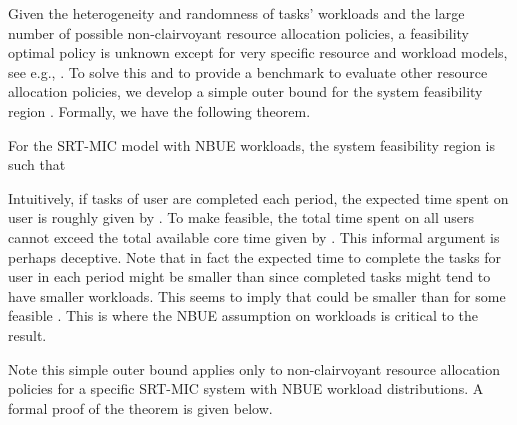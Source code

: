 \documentclass[prodmode,acmtompecs]{acmsmall}
\newcommand{\myComments}[1]{}
\newif\ifinfocom
\newif\iftompecs
\newif\ifdissertation
\newcommand{\infocomStart}{\ifinfocom \myComments{Infocom: }}
\newcommand{\tompecsStart}{\iftompecs \myComments{TOMPECS version: }}
\newcommand{\dissertationStart}{\ifdissertation  \myComments{Dissertation version: }}
\newcommand{\commentEnd}{\myComments{End}}
\begin{document}
\dissertationStart
Intuitively, a feasibility optimal non-clairvoyant design will orchestrate task scheduling across the  cores. For example, the system might choose to process tasks with the maximum conditional probability of success to maximize the expected number of task completions in some periods while guaranteeing fairness and thus the required  of users in other periods. 
\commentEnd\fi

Given the heterogeneity and randomness of tasks' workloads and the large number of possible non-clairvoyant resource allocation policies, a feasibility optimal policy is unknown except for very specific resource and workload models, see e.g., \cite{HoK12A}. To solve this and to provide a benchmark to evaluate other resource allocation policies, we develop a simple outer bound  for the system feasibility region . 
Formally, we have the following theorem. 
\begin{theorem}
\label{thm_optimal_benchmark}
For the SRT-MIC  model with NBUE workloads, the system feasibility region  is such that 

\end{theorem}

Intuitively, if  tasks of user  are completed each period, the expected time spent on user  is roughly given by . To make  feasible, the total time spent on all users  cannot exceed the total available core time given by . 
This informal argument is perhaps deceptive. 
Note that in fact the expected time to complete the  tasks for user  in each period might be smaller than  since completed tasks might tend to have smaller workloads. This seems to imply that  could be smaller than  for some feasible . This is where the NBUE assumption on workloads is critical to the result. 
\infocomStart
See Appendix \ref{appendix_pf_R_OB} for a detailed proof. 

This simple outer bound applies to any non-clairvoyant resource allocation policy in any specific SRT-MIC system with NBUE workload distributions. 
Note however the result does not necessarily hold for non-NBUE workloads. See the extended version of this paper \cite{EXT} for an illustrative example. 
\commentEnd\fi

\tompecsStart
Note this simple outer bound applies only to non-clairvoyant resource allocation policies for a specific SRT-MIC system with NBUE workload distributions. 
A formal proof of the theorem is given below. 
\end{document}
